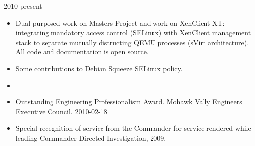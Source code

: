 \documentclass[letterpaper,11pt]{article}
\begin{document}
       {2010} {present}
      \begin {itemize}
        \setlength {\itemsep}{1pt}
        \setlength {\parskip}{0pt}
        \setlength {\parsep}{0pt}
      \item Dual purposed work on Masters Project and work on XenClient XT: integrating mandatory access control (SELinux) with XenClient management stack to separate mutually distructing QEMU processes (sVirt architecture).  All code and documentation is open source.
      \item Some contributions to Debian Squeeze SELinux policy.
      \end {itemize}
    \begin{itemize}
    \item[]
    \end{itemize}

    \begin {itemize}
      \setlength {\itemsep}{1pt}
      \setlength {\parskip}{0pt}
      \setlength {\parsep}{0pt}
    \item Outstanding Engineering Professionalism Award.
      Mohawk Vally Engineers Executive Council.
      2010-02-18
    \item Special recognition of service from the Commander for service rendered while leading Commander Directed Investigation, 2009.
    \end {itemize}
\end{document}

